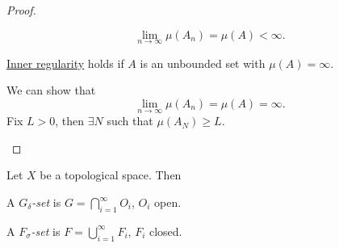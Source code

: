 \begin{proof}
\begin{enumerate}[(a)]
\begin{explanation}
			      \[
				      \lim_{n \to \infty} \mu (A_{n}) = \mu (A) < \infty .
			      \]
		      \end{explanation}
		      \begin{claim}
			      \hyperref[thm:inner-regularity]{Inner regularity} holds if \(A\) is an unbounded set with \(\mu (A) = \infty \).
		      \end{claim}
		      \begin{explanation}
			      We can show that
			      \[
				      \lim_{n \to \infty} \mu (A_{n}) = \mu (A) = \infty.
			      \]
			      Fix \(L>0\), then \(\exists N\) such that \(\mu (A_{N})\geq L\).
		      \end{explanation}
	\end{enumerate}
\end{proof}

\begin{definition*}
	Let \(X\) be a topological space. Then
	\begin{definition}\label{def:G-delta-set}
		A \emph{\(G_{\delta}\)-set} is \(G = \bigcap_{i=1}^{\infty} O_{i}\), \(O_{i}\) open.
	\end{definition}

	\begin{definition}\label{def:F-sigma-set}
		A \emph{\(F_{\sigma}\)-set} is \(F = \bigcup_{i=1}^{\infty} F_{i}\), \(F_{i}\) closed.
	\end{definition}
\end{definition*}

